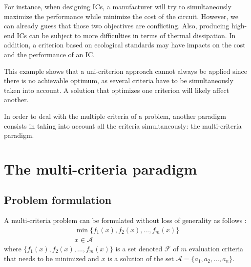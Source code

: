 For instance, when designing ICs, a manufacturer will try to simultaneously maximize the performance while minimize the cost of the circuit. However, we can already guess that those two objectives are conflicting. Also, producing high-end ICs can be subject to more difficulties in terms of thermal dissipation. In addition, a criterion based on ecological standards may have impacts on the cost and the performance of an IC.

This example shows that a uni-criterion approach cannot always be applied since there is no achievable optimum, as several criteria have to be simultaneously taken into account. A solution that optimizes one criterion will likely affect another.

In order to deal with the multiple criteria of a problem, another paradigm consists in taking into account all the criteria simultaneously: the multi-criteria paradigm. %

\section{The multi-criteria paradigm}
\label{sec:rol2.multicrit_paradigm}


\subsection{Problem formulation}
A multi-criteria problem can be formulated without loss of generality as follows \cite{BraMar2002}:
\begin{equation}
\label{multicrit_formulation}
\begin{gathered}
\min \{f_1(x), f_2(x), \dots, f_m(x)\}\\
x \in \mathcal{A}
\end{gathered}
\end{equation}
where $\{f_1(x), f_2(x), \dots, f_m(x)\}$ is a set denoted $\mathcal{F}$ of $m$ evaluation criteria that needs to be minimized and $x$ is a solution of the set $\mathcal{A} = \{a_1, a_2, \dots, a_n\}$.

